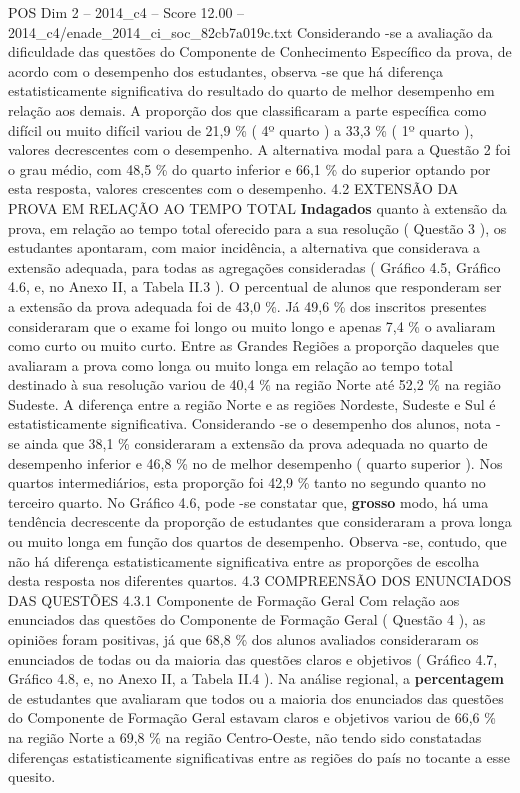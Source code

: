 \begin{textsample}{POS Dim 2 – 2014\_c4 – Score 12.00 – 2014\_c4/enade\_2014\_ci\_soc\_82cb7a019c.txt}
Considerando -se a avaliação da dificuldade das questões do Componente de Conhecimento Específico da prova, de acordo com o desempenho dos estudantes, observa -se que há diferença estatisticamente significativa do resultado do quarto de melhor desempenho em relação aos demais.
A proporção dos que classificaram a parte específica como difícil ou muito difícil variou de 21,9 \% ( 4º quarto ) a 33,3 \% ( 1º quarto ), valores decrescentes com o desempenho.
A alternativa modal para a Questão 2 foi o grau médio, com 48,5 \% do quarto inferior e 66,1 \% do superior optando por esta resposta, valores crescentes com o desempenho. 4.2 EXTENSÃO DA PROVA EM RELAÇÃO AO TEMPO TOTAL \textbf{Indagados} quanto à extensão da prova, em relação ao tempo total oferecido para a sua resolução ( Questão 3 ), os estudantes apontaram, com maior incidência, a alternativa que considerava a extensão adequada, para todas as agregações consideradas ( Gráfico 4.5, Gráfico 4.6, e, no Anexo II, a Tabela II.3 ).
O percentual de alunos que responderam ser a extensão da prova adequada foi de 43,0 \%.
Já 49,6 \% dos inscritos presentes consideraram que o exame foi longo ou muito longo e apenas 7,4 \% o avaliaram como curto ou muito curto.
Entre as Grandes Regiões a proporção daqueles que avaliaram a prova como longa ou muito longa em relação ao tempo total destinado à sua resolução variou de 40,4 \% na região Norte até 52,2 \% na região Sudeste.
A diferença entre a região Norte e as regiões Nordeste, Sudeste e Sul é estatisticamente significativa.
Considerando -se o desempenho dos alunos, nota -se ainda que 38,1 \% consideraram a extensão da prova adequada no quarto de desempenho inferior e 46,8 \% no de melhor desempenho ( quarto superior ).
Nos quartos intermediários, esta proporção foi 42,9 \% tanto no segundo quanto no terceiro quarto.
No Gráfico 4.6, pode -se constatar que, \textbf{grosso} modo, há uma tendência decrescente da proporção de estudantes que consideraram a prova longa ou muito longa em função dos quartos de desempenho.
Observa -se, contudo, que não há diferença estatisticamente significativa entre as proporções de escolha desta resposta nos diferentes quartos. 4.3 COMPREENSÃO DOS ENUNCIADOS DAS QUESTÕES 4.3.1 Componente de Formação Geral Com relação aos enunciados das questões do Componente de Formação Geral ( Questão 4 ), as opiniões foram positivas, já que 68,8 \% dos alunos avaliados consideraram os enunciados de todas ou da maioria das questões claros e objetivos ( Gráfico 4.7, Gráfico 4.8, e, no Anexo II, a Tabela II.4 ).
Na análise regional, a \textbf{percentagem} de estudantes que avaliaram que todos ou a maioria dos enunciados das questões do Componente de Formação Geral estavam claros e objetivos variou de 66,6 \% na região Norte a 69,8 \% na região Centro-Oeste, não tendo sido constatadas diferenças estatisticamente significativas entre as regiões do país no tocante a esse quesito.

\end{textsample}
